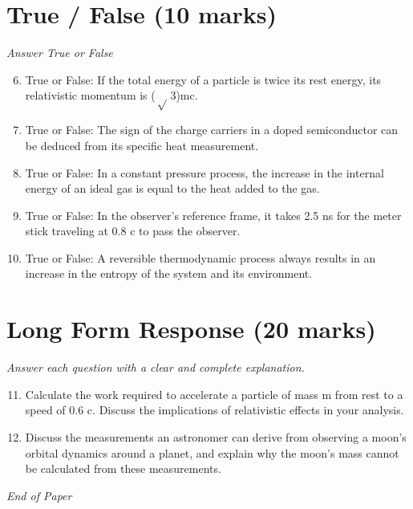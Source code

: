 \documentclass[12pt]{article}
\begin{document}
\section*{True / False (10 marks)}
\textit{Answer True or False}
\begin{enumerate}[label=\arabic*.]
\setcounter{enumi}{5}
\item True or False: If the total energy of a particle is twice its rest energy, its relativistic momentum is (\ensuremath{\sqrt} 3)mc.
\item True or False: The sign of the charge carriers in a doped semiconductor can be deduced from its specific heat measurement.
\item True or False: In a constant pressure process, the increase in the internal energy of an ideal gas is equal to the heat added to the gas.
\item True or False: In the observer's reference frame, it takes 2.5 ns for the meter stick traveling at 0.8 c to pass the observer.
\item True or False: A reversible thermodynamic process always results in an increase in the entropy of the system and its environment.
\end{enumerate}

\section*{Long Form Response (20 marks)}
\textit{Answer each question with a clear and complete explanation.}
\begin{enumerate}[label=\arabic*.]
\setcounter{enumi}{10}
\item Calculate the work required to accelerate a particle of mass m from rest to a speed of 0.6 c. Discuss the implications of relativistic effects in your analysis.
\item Discuss the measurements an astronomer can derive from observing a moon's orbital dynamics around a planet, and explain why the moon's mass cannot be calculated from these measurements.
\end{enumerate}

\vfill
\noindent\textit{End of Paper}
\end{document}
